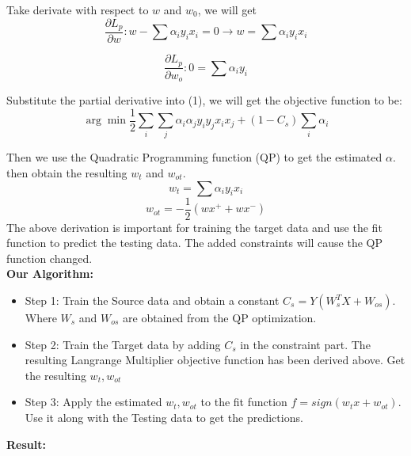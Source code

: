 \documentclass{article}
\begin{document}
Take derivate with respect to $w$ and $w_0$, we will get 
\[ \dfrac{\partial L_p}{\partial w}: w-\sum \alpha_iy_ix_i=0 \rightarrow w=\sum \alpha_iy_ix_i\]

\[ \dfrac{\partial L_p}{\partial w_o}:  0=\sum \alpha_iy_i\]

Substitute the partial derivative into (1), we will get the objective function to be: 
\begin{equation}
\arg \min \dfrac{1}{2}\sum_i\sum_j \alpha_i \alpha_j y_iy_jx_ix_j+(1-C_s)\sum_i \alpha_i
\end{equation}

Then we use the Quadratic Programming function (QP) to get the estimated $\alpha$. then obtain the resulting $w_t$ and $w_{ot}$.
\[w_t=\sum \alpha_iy_ix_i\]
\[w_{ot}=-\dfrac{1}{2}(wx^+ +wx^-)\]
The above derivation is important for training the target data and use the fit function to predict the testing data. The added constraints will cause the QP function changed. 
\\

\textbf{Our Algorithm:} 
\begin{itemize}
	\item Step 1: Train the Source data and obtain a constant $ C_s=Y(W_s^TX+W_{os})$. Where $W_s$ and $W_{os}$ are obtained from the QP optimization.\\
	
	\item Step 2: Train the Target data by adding $C_s$ in the constraint part. The resulting Langrange Multiplier objective function has been derived above. Get the resulting $w_t, w_{ot}$ \\
	
	\item Step 3: Apply the estimated $w_t, w_{ot}$ to the fit function $f=sign(w_t x+w_{ot})$.  Use it along with the Testing data to get the predictions. 
\end{itemize}

\textbf{Result:}
\end{document}
